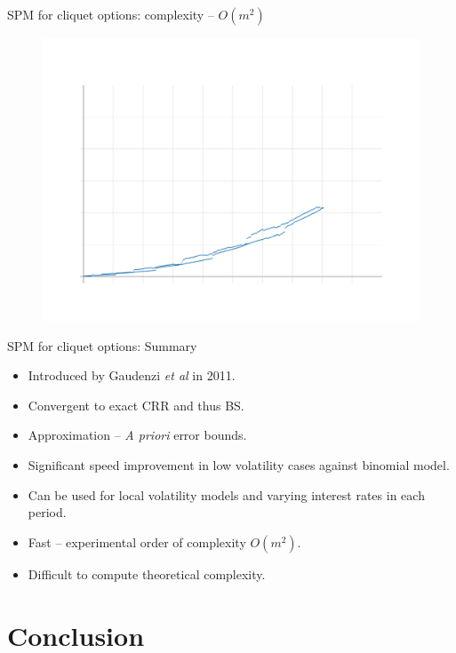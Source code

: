 \documentclass[utf8,t,xcolor=svgnames]{beamer}
\newcommand\pro{\item[\textbf{\CheckedBox}]}
\newcommand\con{\item[\textbf{\XBox}]}
\newcommand\neu{\item[\textbf{\Square}]}
\begin{document}
\begin{frame}{SPM for cliquet options: complexity -- $ O(m^2) $}
	\begin{figure}
		\centering
		\includegraphics[height=0.75\textheight,width=\textwidth]{../img/timing-cliquet}
	\end{figure}
\end{frame}


\begin{frame}{SPM for cliquet options: Summary}
	\begin{itemize}
		\neu Introduced by Gaudenzi \emph{et al} \cite{Gaudenzi2011} in 2011.
		\pro Convergent to exact CRR and thus BS.
		\pro Approximation -- \emph{A priori} error bounds.
		\pro Significant speed improvement in low volatility cases against binomial model.
		\pro<alert@1-> Can be used for local volatility models and varying interest rates in each period.
		\pro<alert@1-> Fast -- experimental order of complexity $ O(m^2) $.
		\con Difficult to compute theoretical complexity.
	\end{itemize}
\end{frame}


\section{Conclusion}
\end{document}
